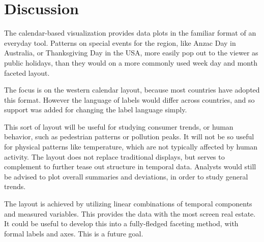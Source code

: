 \documentclass[12pt]{article}
\begin{document}
\hypertarget{discussion}{%
\section{Discussion}\label{discussion}}

\label{sec:discussion}

The calendar-based visualization provides data plots in the familiar
format of an everyday tool. Patterns on special events for the region,
like Anzac Day in Australia, or Thanksgiving Day in the USA, more easily
pop out to the viewer as public holidays, than they would on a more
commonly used week day and month faceted layout.

The focus is on the western calendar layout, because most countries have
adopted this format. However the language of labels would differ across
countries, and so support was added for changing the label language
simply.

This sort of layout will be useful for studying consumer trends, or
human behavior, such as pedestrian patterns or pollution peaks. It will
not be so useful for physical patterns like temperature, which are not
typically affected by human activity. The layout does not replace
traditional displays, but serves to complement to further tease out
structure in temporal data. Analysts would still be advised to plot
overall summaries and deviations, in order to study general trends.

The layout is achieved by utilizing linear combinations of temporal
components and measured variables. This provides the data with the most
screen real estate. It could be useful to develop this into a
fully-fledged faceting method, with formal labels and axes. This is a
future goal.



\end{document}
